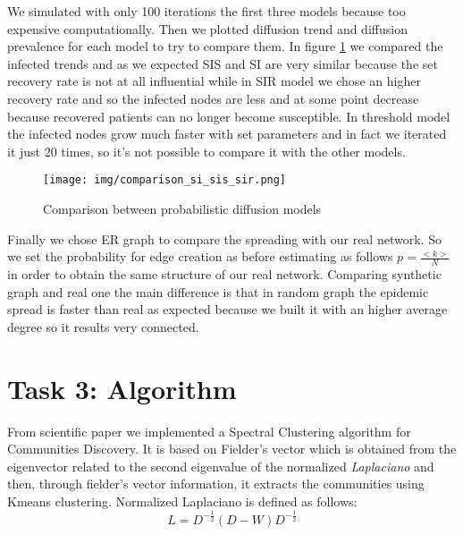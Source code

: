 \documentclass[sigchi]{acmart}
\begin{document}
We simulated with only 100 iterations the first three models because too expensive computationally. Then we plotted diffusion trend and diffusion prevalence for each model to try to compare them. In figure \ref{seir} we compared the infected trends and as we expected SIS and SI are very similar because the set recovery rate is not at all influential while in SIR model we chose an higher recovery rate and so the  infected nodes are less and at some point decrease because recovered patients can no longer become susceptible. \newline
In threshold model the infected nodes grow much faster with set parameters and in fact we iterated it just 20 times, so it's not possible to compare it with the other models.

\begin{figure}[h]
  \centering
  \texttt{[image: img/comparison\_si\_sis\_sir.png]}
  \caption{Comparison between probabilistic diffusion models}
  \label{seir}
\end{figure}
Finally we chose ER graph to compare the spreading with our real network. So we set the probability for edge creation as before estimating as follows $p=\frac{<k>}{N}$ in order to obtain the same structure of our real network. \newline
Comparing synthetic graph and real one the main difference is that in random graph the epidemic spread is faster than real as expected because we built it with an higher average degree so it results very connected. 
 


\section{Task 3: Algorithm} \label{sec6}
From scientific paper \cite{lorem} we implemented a Spectral Clustering algorithm for Communities Discovery. It is based on Fielder's vector which is obtained from the eigenvector related to the second eigenvalue of the normalized \textit{Laplaciano} and then, through fielder's vector information, it extracts the communities using Kmeans clustering.\newline
Normalized Laplaciano is defined as follows:
\[ 
L = D^{-\frac{1}{2}} (D-W) D^{-\frac{1}{2}}
\]
\end{document}
